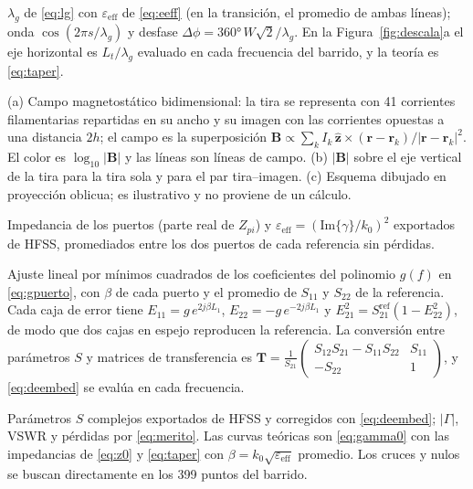 \documentclass[11pt,letterpaper]{article}
\begin{document}
\begin{description}[style=nextline,leftmargin=0pt,itemsep=4pt,font=\normalfont\bfseries]
\item[Figuras~\ref{fig:escala} y~\ref{fig:descala} (escala de la onda)] $\lambda_g$ de \eqref{eq:lg} con $\varepsilon_{\mathrm{eff}}$ de \eqref{eq:eeff} (en la transición, el promedio de ambas líneas); onda $\cos(2\pi s/\lambda_g)$ y desfase $\Delta\phi=\ang{360}\,W\sqrt{2}/\lambda_g$. En la Figura~\ref{fig:descala}a el eje horizontal es $L_t/\lambda_g$ evaluado en cada frecuencia del barrido, y la teoría es \eqref{eq:taper}.

\item[Figura~\ref{fig:imagen} (tira e imagen)]
(a) Campo magnetostático bidimensional: la tira se representa con 41 corrientes filamentarias repartidas en su ancho y su imagen con las corrientes opuestas a una distancia $2h$; el campo es la superposición $\mathbf{B}\propto\sum_k I_k\,\hat{\mathbf{z}}\times(\mathbf{r}-\mathbf{r}_k)/|\mathbf{r}-\mathbf{r}_k|^2$. El color es $\log_{10}|\mathbf{B}|$ y las líneas son líneas de campo.
(b) $|\mathbf{B}|$ sobre el eje vertical de la tira para la tira sola y para el par tira--imagen.
(c) Esquema dibujado en proyección oblicua; es ilustrativo y no proviene de un cálculo.

\item[Tabla~\ref{tab:dlineas} (líneas del cambio de ancho)] Impedancia de los puertos (parte real de $Z_{pi}$) y $\varepsilon_{\mathrm{eff}}=(\mathrm{Im}\{\gamma\}/k_0)^2$ exportados de HFSS, promediados entre los dos puertos de cada referencia sin pérdidas.

\item[Figura~\ref{fig:dcorr} (corrección de puertos)] Ajuste lineal por mínimos cuadrados de los coeficientes del polinomio $g(f)$ en \eqref{eq:gpuerto}, con $\beta$ de cada puerto y el promedio de $S_{11}$ y $S_{22}$ de la referencia. Cada caja de error tiene $E_{11}=g\,e^{2j\beta L_1}$, $E_{22}=-g\,e^{-2j\beta L_1}$ y $E_{21}^2=S_{21}^{\mathrm{ref}}(1-E_{22}^2)$, de modo que dos cajas en espejo reproducen la referencia. La conversión entre parámetros $S$ y matrices de transferencia es $\mathbf{T}=\frac{1}{S_{21}}\begin{pmatrix}S_{12}S_{21}-S_{11}S_{22} & S_{11}\\ -S_{22} & 1\end{pmatrix}$, y \eqref{eq:deembed} se evalúa en cada frecuencia.

\item[Figuras~\ref{fig:dsdb}, \ref{fig:dgamma} y~\ref{fig:dsmith}; Tabla~\ref{tab:dsparam}] Parámetros $S$ complejos exportados de HFSS y corregidos con \eqref{eq:deembed}; $|\Gamma|$, VSWR y pérdidas por \eqref{eq:merito}. Las curvas teóricas son \eqref{eq:gamma0} con las impedancias de \eqref{eq:z0} y \eqref{eq:taper} con $\beta=k_0\sqrt{\varepsilon_{\mathrm{eff}}}$ promedio. Los cruces y nulos se buscan directamente en los 399 puntos del barrido.


\end{description}
\end{document}
